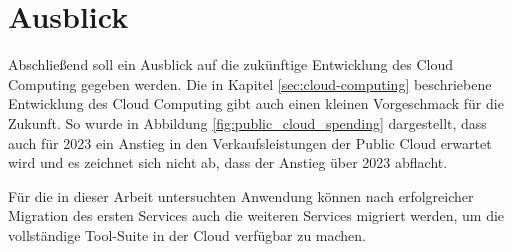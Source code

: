 \section{Ausblick}
Abschließend soll ein Ausblick auf die zukünftige Entwicklung des Cloud Computing gegeben werden. Die in Kapitel \ref{sec:cloud-computing} beschriebene Entwicklung des Cloud Computing gibt auch einen kleinen Vorgeschmack für die Zukunft. So wurde in Abbildung \ref{fig:public_cloud_spending} dargestellt, dass auch für 2023 ein Anstieg in den Verkaufsleistungen der Public Cloud erwartet wird und es zeichnet sich nicht ab, dass der Anstieg über 2023 abflacht.

Für die in dieser Arbeit untersuchten Anwendung können nach erfolgreicher Migration des ersten Services auch die weiteren Services migriert werden, um die vollständige Tool-Suite in der Cloud verfügbar zu machen.